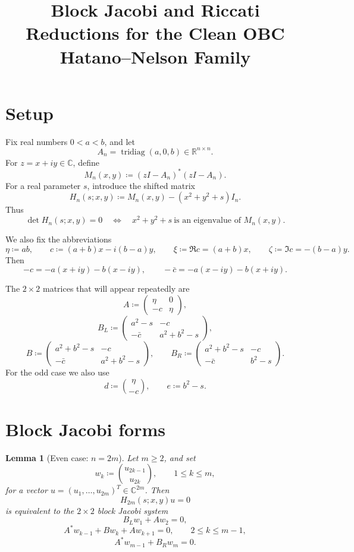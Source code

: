 \documentclass[11pt]{article}
\title{Block Jacobi and Riccati Reductions for the Clean OBC Hatano--Nelson Family}
\author{}
\date{}
\newtheorem{lemma}{Lemma}[section]
\newcommand{\C}{\mathbb C}
\newcommand{\R}{\mathbb R}
\begin{document}
\maketitle

\section{Setup}

Fix real numbers \(0<a<b\), and let
\[
A_n=\operatorname{tridiag}(a,0,b)\in\R^{n\times n}.
\]
For \(z=x+iy\in\C\), define
\[
M_n(x,y)\coloneqq (zI-A_n)^*(zI-A_n).
\]
For a real parameter \(s\), introduce the shifted matrix
\[
H_n(s;x,y)\coloneqq M_n(x,y)-(x^2+y^2+s)I_n.
\]
Thus
\[
\det H_n(s;x,y)=0
\quad\Longleftrightarrow\quad
x^2+y^2+s
\ \text{is an eigenvalue of }M_n(x,y).
\]

We also fix the abbreviations
\[
\eta\coloneqq ab,
\qquad
c\coloneqq (a+b)x-i(b-a)y,
\qquad
\xi\coloneqq \Re c=(a+b)x,
\qquad
\zeta\coloneqq \Im c=-(b-a)y.
\]
Then
\[
-c=-a(x+iy)-b(x-iy),
\qquad
-\bar c=-a(x-iy)-b(x+iy).
\]

The \(2\times 2\) matrices that will appear repeatedly are
\[
A\coloneqq
\begin{pmatrix}
\eta & 0\\
-c & \eta
\end{pmatrix},
\]
\[
B_L\coloneqq
\begin{pmatrix}
a^2-s & -c\\
-\bar c & a^2+b^2-s
\end{pmatrix},
\]
\[
B\coloneqq
\begin{pmatrix}
a^2+b^2-s & -c\\
-\bar c & a^2+b^2-s
\end{pmatrix},
\qquad
B_R\coloneqq
\begin{pmatrix}
a^2+b^2-s & -c\\
-\bar c & b^2-s
\end{pmatrix}.
\]
For the odd case we also use
\[
d\coloneqq
\binom{\eta}{-c},
\qquad
e\coloneqq b^2-s.
\]

\section{Block Jacobi forms}

\begin{lemma}[Even case: \(n=2m\)]\label{lem:even-block}
Let \(m\ge 2\), and set
\[
w_k\coloneqq \binom{u_{2k-1}}{u_{2k}},
\qquad
1\le k\le m,
\]
for a vector \(u=(u_1,\dots,u_{2m})^T\in\C^{2m}\). Then
\[
H_{2m}(s;x,y)u=0
\]
is equivalent to the \(2\times 2\) block Jacobi system
\[
B_L w_1 + A w_2 = 0,
\]
\[
A^* w_{k-1} + B w_k + A w_{k+1} = 0,
\qquad
2\le k\le m-1,
\]
\[
A^* w_{m-1} + B_R w_m = 0.
\]
\end{lemma}
\end{document}
